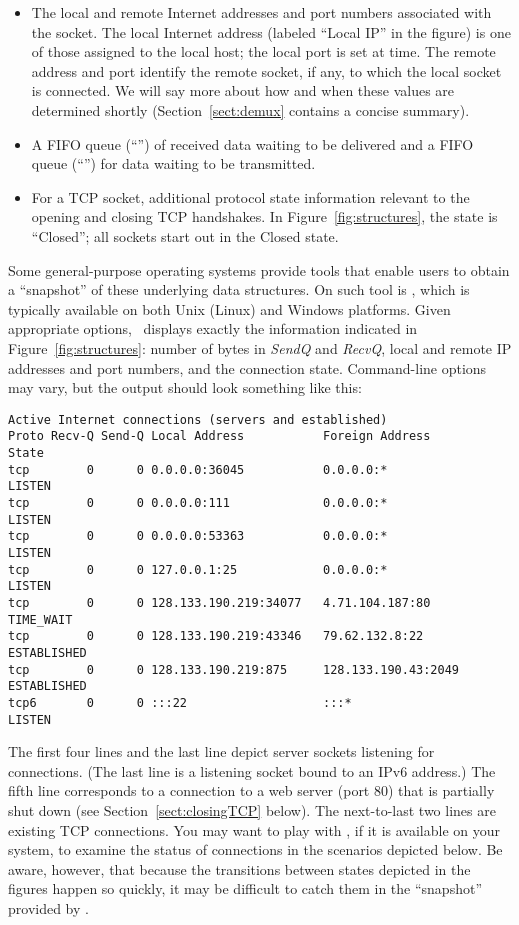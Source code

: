 \begin{itemize}

\item The {local and remote} Internet addresses and port numbers
associated with the socket.  The local Internet address (labeled
``Local IP'' in the figure) is one of those assigned to the local
host; the local port is set at  time.
The remote address and port identify the remote
socket, if any, to which the local socket is connected.  We will say
more about how and when these values are determined shortly
(Section~\ref{sect:demux} contains a concise summary).

\item A FIFO queue (``\sque'') of received data waiting to be delivered and a
FIFO queue (``\rque'') for data waiting to be transmitted.

\item For a TCP socket, additional {protocol state} information
relevant to the opening and closing TCP handshakes.  In
Figure~\ref{fig:structures}, the state is ``Closed''; all sockets start
out in the Closed state.
\end{itemize}
Some general-purpose operating systems provide tools that enable users
to obtain a ``snapshot'' of these underlying data structures.
On such tool is \netstat, which is typically available on both
Unix (Linux) and Windows platforms.  Given appropriate options, 
\netstat\ displays exactly the information indicated in
Figure~\ref{fig:structures}: number of bytes in 
\emph{SendQ} and \emph{RecvQ}, 
local and remote IP addresses and port
numbers, and the connection state.
Command-line options may vary, but the output should look something
like this:
\begin{verbatim}
Active Internet connections (servers and established)
Proto Recv-Q Send-Q Local Address           Foreign Address       State      
tcp        0      0 0.0.0.0:36045           0.0.0.0:*             LISTEN     
tcp        0      0 0.0.0.0:111             0.0.0.0:*             LISTEN     
tcp        0      0 0.0.0.0:53363           0.0.0.0:*             LISTEN     
tcp        0      0 127.0.0.1:25            0.0.0.0:*             LISTEN     
tcp        0      0 128.133.190.219:34077   4.71.104.187:80       TIME_WAIT  
tcp        0      0 128.133.190.219:43346   79.62.132.8:22        ESTABLISHED
tcp        0      0 128.133.190.219:875     128.133.190.43:2049   ESTABLISHED
tcp6       0      0 :::22                   :::*                  LISTEN
\end{verbatim}
The first four lines and the last line
depict server sockets listening for connections.
(The last line is a listening socket bound to an IPv6 address.)
The fifth line corresponds to a connection to a web server
(port 80) that is partially shut
down (see Section~\ref{sect:closingTCP} below).
The next-to-last two lines are existing TCP connections.
You may want to play with \netstat, if it is available on your system,
to examine the status of connections in the scenarios depicted below.
Be aware, however, that because the transitions between states
depicted in the figures happen so quickly, it may be difficult to
catch them in the ``snapshot'' provided by \netstat.

